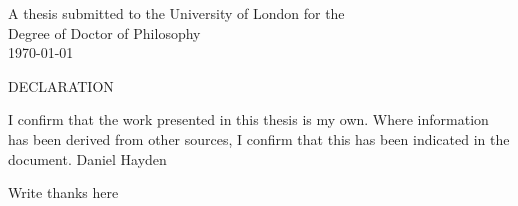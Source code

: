 \documentclass[11pt,a4paper]{report} %
\renewcommand{\chaptermark}[1]{\markboth{#1}{}}
\renewcommand{\sectionmark}[1]{\markright{\thesection\ #1}{}}
\renewcommand{\plainfootrulewidth}{0pt}%
\renewcommand{\baselinestretch}{1.5}
\begin{document}
\begin{titlepage}
\begin{center}
	\vspace{2cm}
				 {A thesis submitted to the University of London for the \\Degree of Doctor of Philosophy\\}
				 \vspace{1cm}
{\today\\}
\end{center}
\end{titlepage}

\newpage
\begin{center}
\vspace*{6cm}
{\LARGE DECLARATION} \newline
\vspace*{1cm}
\end{center}
\vspace{1cm}
I confirm that the work presented in this thesis is my own.  Where information has been derived from other sources, I confirm that this has been indicated in the document.\newline \newline \newline 
\vspace{5cm}
Daniel Hayden 


\begin{abstract}

\end{abstract}

\thispagestyle{empty} %
\begin{center}
Write thanks here



\end{center}
\vspace{1cm}

\tableofcontents
\listoffigures
\listoftables

\newpage

\pagestyle{fancy}
\addtolength{\headwidth}{\marginparsep}
\renewcommand{\chaptermark}[1]{\markboth{#1}{}}
\renewcommand{\sectionmark}[1]{\markright{\thesection\ #1}{}}
\fancyfoot[RO,RE]{\thepage}
\fancyhead[RO]{\leftmark}
\fancyhead[LO]{\rightmark}
\cfoot{}

\fancypagestyle{plain}{\renewcommand{\headrulewidth}{0pt}%
       \renewcommand{\plainfootrulewidth}{0pt}%
        \fancyhead[RO,LO]{}}
\renewcommand{\baselinestretch}{1.5} 

\newpage



\newpage


\end{document}
